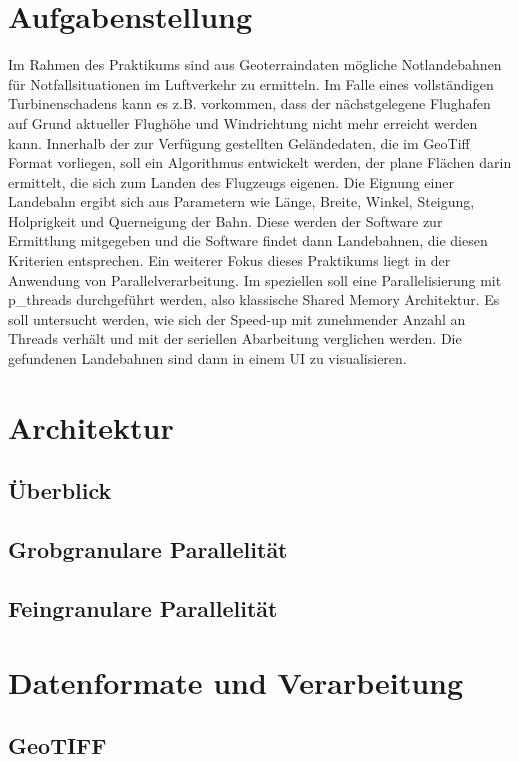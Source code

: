 \documentclass[10pt,a4paper]{report}
\begin{document}
\chapter{Aufgabenstellung}

Im Rahmen des Praktikums sind aus Geoterraindaten mögliche Notlandebahnen für Notfallsituationen im Luftverkehr zu ermitteln. Im Falle eines vollständigen Turbinenschadens kann es z.B. vorkommen, dass der nächstgelegene Flughafen auf Grund aktueller Flughöhe und Windrichtung nicht mehr erreicht werden kann.
Innerhalb der zur Verfügung gestellten Geländedaten, die im GeoTiff Format vorliegen, soll ein Algorithmus entwickelt werden, der plane Flächen darin ermittelt, die sich zum Landen des Flugzeugs eigenen.
Die Eignung einer Landebahn ergibt sich aus Parametern wie Länge, Breite, Winkel, Steigung, Holprigkeit und Querneigung der Bahn. Diese werden der Software zur Ermittlung mitgegeben und die Software findet dann Landebahnen, die diesen Kriterien entsprechen.
Ein weiterer Fokus dieses Praktikums liegt in der Anwendung von Parallelverarbeitung.
Im speziellen soll eine Parallelisierung mit p_threads durchgeführt werden, also klassische Shared Memory Architektur.
Es soll untersucht werden, wie sich der Speed-up mit zunehmender Anzahl an Threads verhält und mit der seriellen Abarbeitung verglichen werden.
Die gefundenen Landebahnen sind dann in einem UI zu visualisieren.

\chapter{Architektur}

\section{Überblick}
\section{Grobgranulare Parallelität}
\section{Feingranulare Parallelität}

\chapter{Datenformate und Verarbeitung}
\section{GeoTIFF}
\end{document}
